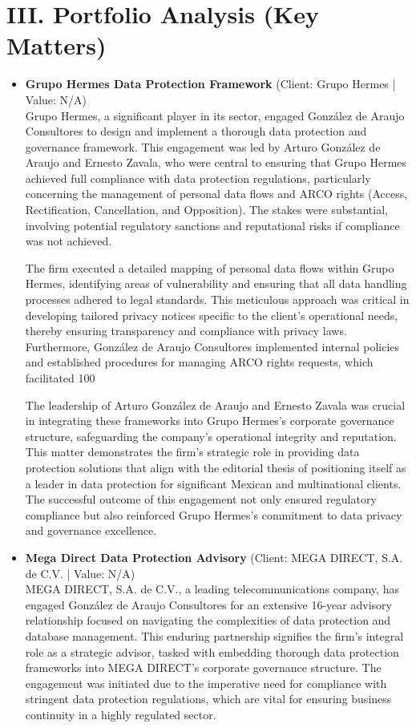 \documentclass[11pt]{article}
\begin{document}
\section*{III. Portfolio Analysis (Key Matters)}
\begin{itemize}
\item \textbf{Grupo Hermes Data Protection Framework} (Client: Grupo Hermes | Value: N/A)\\ Grupo Hermes, a significant player in its sector, engaged González de Araujo Consultores to design and implement a thorough data protection and governance framework. This engagement was led by Arturo González de Araujo and Ernesto Zavala, who were central to ensuring that Grupo Hermes achieved full compliance with data protection regulations, particularly concerning the management of personal data flows and ARCO rights (Access, Rectification, Cancellation, and Opposition). The stakes were substantial, involving potential regulatory sanctions and reputational risks if compliance was not achieved.

The firm executed a detailed mapping of personal data flows within Grupo Hermes, identifying areas of vulnerability and ensuring that all data handling processes adhered to legal standards. This meticulous approach was critical in developing tailored privacy notices specific to the client's operational needs, thereby ensuring transparency and compliance with privacy laws. Furthermore, González de Araujo Consultores implemented internal policies and established procedures for managing ARCO rights requests, which facilitated 100%

The leadership of Arturo González de Araujo and Ernesto Zavala was crucial in integrating these frameworks into Grupo Hermes's corporate governance structure, safeguarding the company's operational integrity and reputation. This matter demonstrates the firm's strategic role in providing data protection solutions that align with the editorial thesis of positioning itself as a leader in data protection for significant Mexican and multinational clients. The successful outcome of this engagement not only ensured regulatory compliance but also reinforced Grupo Hermes's commitment to data privacy and governance excellence.
\item \textbf{Mega Direct Data Protection Advisory} (Client: MEGA DIRECT, S.A. de C.V. | Value: N/A)\\ MEGA DIRECT, S.A. de C.V., a leading telecommunications company, has engaged González de Araujo Consultores for an extensive 16-year advisory relationship focused on navigating the complexities of data protection and database management. This enduring partnership signifies the firm's integral role as a strategic advisor, tasked with embedding thorough data protection frameworks into MEGA DIRECT's corporate governance structure. The engagement was initiated due to the imperative need for compliance with stringent data protection regulations, which are vital for ensuring business continuity in a highly regulated sector.


\end{itemize}
\end{document}
